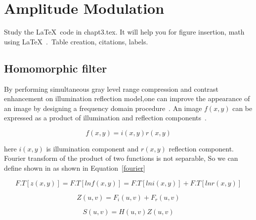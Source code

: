 \chapter{Amplitude Modulation}

Study the \LaTeX\ code in chapt3.tex.
It will help you for figure insertion, math using \LaTeX\ .\, Table creation,
citations, labels.
\section{Homomorphic filter} 
By performing simultaneous gray level range compression and contrast enhancement on illumination reflection model,one can improve the appearance of an image by designing a frequency domain procedure~\cite{man87}.
An image $f(x,y)$ can be expressed as a product of illumination and reflection components~\cite{sam09}.


\begin{equation}
f(x,y)=i(x,y)r(x,y)
\end{equation}


here $ i(x,y) $ is  illumination component and  $ r(x,y) $ reflection component.\\



Fourier transform of the product of two functions is not separable, So we can define shown in as shown in Equation~\ref{fourier}

\begin{equation}
F.T[z(x,y)]=F.T[ln f(x,y)]=F.T[ln i(x,y)]+F.T[ln r(x,y)]
\label{fourier}
\end{equation}

\begin{equation}
Z(u,v)=F_{i}(u,v)+F_{r}(u,v)
\end{equation}


 \begin{equation}
  S(u,v)=H(u,v)Z(u,v)
 \end{equation}



